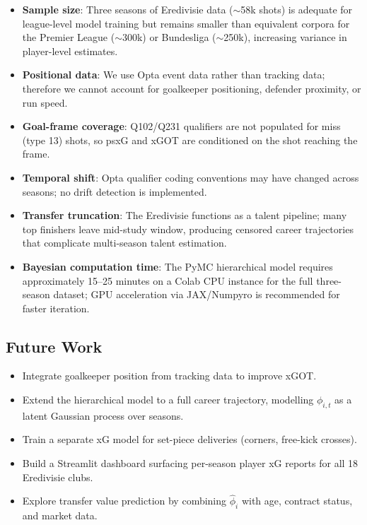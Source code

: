 \documentclass[12pt,a4paper]{article}
\begin{document}
\begin{itemize}
    \item \textbf{Sample size}: Three seasons of Eredivisie data ($\sim$58k shots) is adequate for league-level model training but remains smaller than equivalent corpora for the Premier League ($\sim$300k) or Bundesliga ($\sim$250k), increasing variance in player-level estimates.
    \item \textbf{Positional data}: We use Opta event data rather than tracking data; therefore we cannot account for goalkeeper positioning, defender proximity, or run speed.
    \item \textbf{Goal-frame coverage}: Q102/Q231 qualifiers are not populated for miss (type 13) shots, so psxG and xGOT are conditioned on the shot reaching the frame.
    \item \textbf{Temporal shift}: Opta qualifier coding conventions may have changed across seasons; no drift detection is implemented.
    \item \textbf{Transfer truncation}: The Eredivisie functions as a talent pipeline; many top finishers leave mid-study window, producing censored career trajectories that complicate multi-season talent estimation.
    \item \textbf{Bayesian computation time}: The PyMC hierarchical model requires approximately 15--25 minutes on a Colab CPU instance for the full three-season dataset; GPU acceleration via JAX/Numpyro is recommended for faster iteration.
\end{itemize}

\subsection{Future Work}

\begin{itemize}
    \item Integrate goalkeeper position from tracking data to improve xGOT.
    \item Extend the hierarchical model to a full career trajectory, modelling $\phi_{i,t}$ as a latent Gaussian process over seasons.
    \item Train a separate xG model for set-piece deliveries (corners, free-kick crosses).
    \item Build a Streamlit dashboard surfacing per-season player xG reports for all 18 Eredivisie clubs.
    \item Explore transfer value prediction by combining $\hat{\phi}_i$ with age, contract status, and market data.
\end{itemize}
\end{document}
